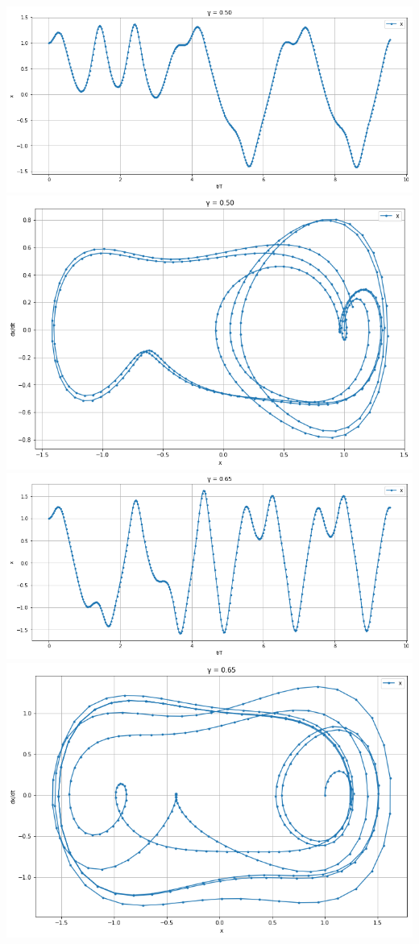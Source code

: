 \documentclass{article}
\begin{document}
\begin{center}
    \includegraphics[scale = 0.3]{501.png}
    \includegraphics[scale = 0.23]{502.png}
    \includegraphics[scale = 0.3]{651.png}
    \includegraphics[scale = 0.23]{652.png}
\end{center}
\end{document}

